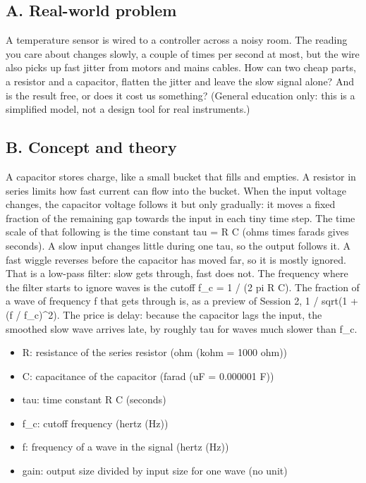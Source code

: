 \documentclass[11pt,a4paper]{article}
\begin{document}
\subsection*{A. Real-world problem}
A temperature sensor is wired to a controller across a noisy room. The reading you care about changes slowly, a couple of times per second at most, but the wire also picks up fast jitter from motors and mains cables. How can two cheap parts, a resistor and a capacitor, flatten the jitter and leave the slow signal alone? And is the result free, or does it cost us something? (General education only: this is a simplified model, not a design tool for real instruments.)

\subsection*{B. Concept and theory}
A capacitor stores charge, like a small bucket that fills and empties. A resistor in series limits how fast current can flow into the bucket. When the input voltage changes, the capacitor voltage follows it but only gradually: it moves a fixed fraction of the remaining gap towards the input in each tiny time step. The time scale of that following is the time constant tau = R C (ohms times farads gives seconds). A slow input changes little during one tau, so the output follows it. A fast wiggle reverses before the capacitor has moved far, so it is mostly ignored. That is a low-pass filter: slow gets through, fast does not. The frequency where the filter starts to ignore waves is the cutoff f\_c = 1 / (2 pi R C). The fraction of a wave of frequency f that gets through is, as a preview of Session 2, 1 / sqrt(1 + (f / f\_c)\textasciicircum{}2). The price is delay: because the capacitor lags the input, the smoothed slow wave arrives late, by roughly tau for waves much slower than f\_c.

\begin{itemize}[nosep]
\item R: resistance of the series resistor (ohm (kohm = 1000 ohm))
\item C: capacitance of the capacitor (farad (uF = 0.000001 F))
\item tau: time constant R C (seconds)
\item f\_c: cutoff frequency (hertz (Hz))
\item f: frequency of a wave in the signal (hertz (Hz))
\item gain: output size divided by input size for one wave (no unit)
\end{itemize}
\end{document}
